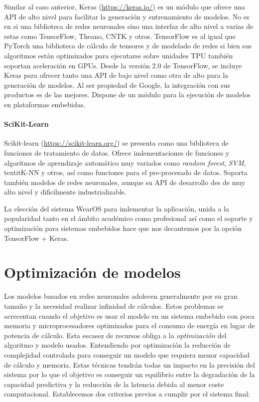 Similar al caso anterior, Keras (\url{https://keras.io/}) es un módulo que ofrece una API de alto nivel para facilitar la generación y entrenamiento de modelos. No es en si una biblioteca de redes neuronales sino una interfaz de alto nivel a varias de estas como TensorFlow, Theano, CNTK y otros. TensorFlow es al igual que PyTorch una biblioteca de cálculo de tensores y de modelado de redes si bien sus algoritmos están optimizados para ejecutarse sobre unidades TPU también soportan aceleración en GPUs. Desde la versión 2.0 de TensorFlow, se incluye Keras para ofrecer tanto una API de bajo nivel como otra de alto para la generación de modelos. Al ser propiedad de Google, la integración con sus productos es de las mejores. Dispone de un módulo para la ejecución de modelos en plataformas embebidas.

\paragraph{SciKit-Learn}

Scikit-learn (\url{https://scikit-learn.org/}) se presenta como una biblioteca de funciones de tratamiento de datos. Ofrece imlementaciones de funciones y algoritmos de aprendizaje automático muy variados como \textit{random forest}, \textit{SVM}, textit{K-NN} y otros, así como funciones para el pre-procesado de datos. Soporta también modelos de redes neuronales, aunque su API de desarrollo des de muy alto nivel y dificilmente industrializable.

La elección del sistema WearOS para imlementar la aplicación, unida a la popularidad tanto en el ámbito académico como profesional así como el soporte y optimización para sistemas embebidos hace que nos decantemos por la opción TensorFlow + Keras.

\section{Optimización de modelos}\label{sec:req:optimizacion}

Los modelos basados en redes neuronales adolecen generalmente por su gran tamaño y la necesidad realizar infinidad de cálculos. Estos problemas se acrecentan cuando el objetivo es usar el modelo en un sistema embebido con poca memoria y microprocesadores optimizados para el consumo de energía en lugar de potencia de cálculo. Esta escasez de recursos obliga a la \textit{optimización} del algoritmo y modelo usados. Entendiendo por optimización la reducción de complejidad controlada para conseguir un modelo que requiera menor capacidad de cálculo y memoria. Estas técnicas tendrán todas un impacto en la precisión del sistema por lo que el objetivo es conseguir un equilibrio entre la degradación de la capacidad predictiva y la reducción de la latencia debida al menor coste computacional. Establecemos dos criterios previos a cumplir por el sistema final:

